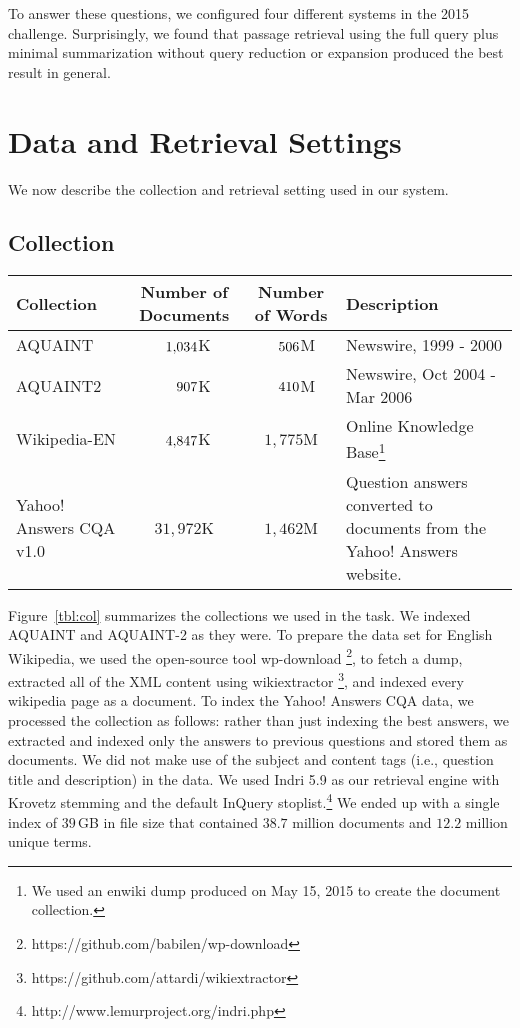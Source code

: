\documentclass[a4paper,10pt,conference,compsocconf,final]{IEEEtran}
\newcommand\method[1]{{\sf\small{#1}}}
\def\D{\hphantom{1}}
\def\C{\hphantom{1,}}
\newcommand\gb[1]{$#1$\,GB}
\begin{document}
\bigskip

To answer these questions, we configured four different systems 
in the 2015 challenge.
Surprisingly, we found that passage retrieval using the full query
plus minimal summarization without query reduction or expansion
produced the best result in general.

\section{Data and Retrieval Settings}
We now describe the collection and retrieval setting used in our
system.

\subsection{Collection}

\begin{table*}[!t]
\centering
\caption{Summary of collections indexed to answer questions.\label{tbl:col}}
\begin{tabular}{p{35mm}ccp{50mm}}
\toprule
{\bf Collection} & {\bf Number of Documents} & {\bf Number of Words} & {\bf Description} \\
\midrule
AQUAINT & $\D1{,}034$K & $\C506$M & Newswire, 1999 - 2000 \\
AQUAINT2 & $\D\C907$K & $\C410$M & Newswire, Oct 2004 - Mar 2006 \\
Wikipedia-EN & $\D4{,}847$K & $1{,}775$M & Online Knowledge Base\footnote{We used an enwiki dump produced on May 15, 2015 to create the document collection.} \\
Yahoo! Answers CQA v1.0 & $31{,}972$K & $1{,}462$M & Question answers converted to documents from the Yahoo! Answers website.
\\
\bottomrule
\end{tabular}
\end{table*}

Figure~{\ref{tbl:col}} summarizes the collections we used in the task.  We
indexed AQUAINT and AQUAINT-2 as they were.  To prepare the data set for
English Wikipedia, we used the open-source tool {\method{wp-download}}
\footnote{https://github.com/babilen/wp-download}, to fetch a dump, extracted
all of the XML content using {\method{wikiextractor}} \footnote{
https://github.com/attardi/wikiextractor}, and indexed every wikipedia page as
a document.  To index the Yahoo!  Answers CQA data, we processed the collection
as follows: rather than just indexing the best answers, we extracted and
indexed only the answers to previous questions and stored them as documents.
We did not make use of the subject and content tags (i.e., question title and
description) in the data.  We used Indri 5.9 as our retrieval engine with
Krovetz stemming and the default InQuery
stoplist.\footnote{http://www.lemurproject.org/indri.php} We ended up with a
single index of \gb{39} in file size that contained $38.7$ million documents
and $12.2$ million unique terms.
\end{document}
